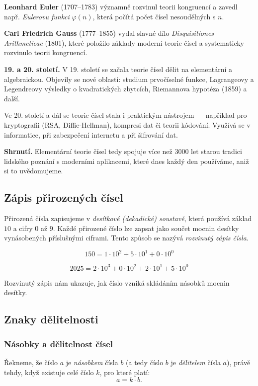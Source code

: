 \documentclass[12pt,a4paper]{article}
\begin{document}
\begin{historicalbox}
\smallskip
\textbf{Leonhard Euler} (1707–1783) významně rozvinul teorii kongruencí a zavedl např. \emph{Eulerovu funkci} $\varphi(n)$, která počítá počet čísel nesoudělných s $n$.  

\smallskip
\textbf{Carl Friedrich Gauss} (1777–1855) vydal slavné dílo \emph{Disquisitiones Arithmeticae} (1801), které položilo základy moderní teorie čísel a systematicky rozvinulo teorii kongruencí.

\smallskip
\textbf{19. a 20. století.}  
V 19. století se začala teorie čísel dělit na elementární a algebraickou. Objevily se nové oblasti: studium prvočíselné funkce, Lagrangeovy a Legendreovy výsledky o kvadratických zbytcích, Riemannova hypotéza (1859) a další.  

Ve 20. století a dál se teorie čísel stala i praktickým nástrojem — například pro kryptografii (RSA, Diffie-Hellman), kompresi dat či teorii kódování. Využívá se v informatice, při zabezpečení internetu a při šifrování dat.

\smallskip
\textbf{Shrnutí.}  
Elementární teorie čísel tedy spojuje více než 3000 let starou tradici lidského poznání s moderními aplikacemi, které dnes každý den používáme, aniž si to uvědomujeme.
\end{historicalbox}


\subsection{Zápis přirozených čísel}

Přirozená čísla zapisujeme v \emph{desítkové (dekadické) soustavě}, která používá základ $10$ a cifry $0$ až $9$.  
Každé přirozené číslo lze zapsat jako součet mocnin desítky vynásobených příslušnými ciframi. Tento způsob se nazývá \emph{rozvinutý zápis čísla}.  

\[
150 = 1 \cdot 10^2 + 5 \cdot 10^1 + 0 \cdot 10^0
\]

\[
2025 = 2 \cdot 10^3 + 0 \cdot 10^2 + 2 \cdot 10^1 + 5 \cdot 10^0
\]

Rozvinutý zápis nám ukazuje, jak číslo vzniká skládáním násobků mocnin desítky.  



\subsection{Znaky dělitelnosti}
\subsubsection*{Násobky a dělitelnost čísel}
Řekneme, že číslo $a$ je \emph{násobkem} čísla $b$ (a tedy číslo $b$ je \emph{dělitelem} čísla $a$), právě tehdy, když existuje celé číslo $k$, pro které platí:
\[
a = k \cdot b.
\]
\end{document}
